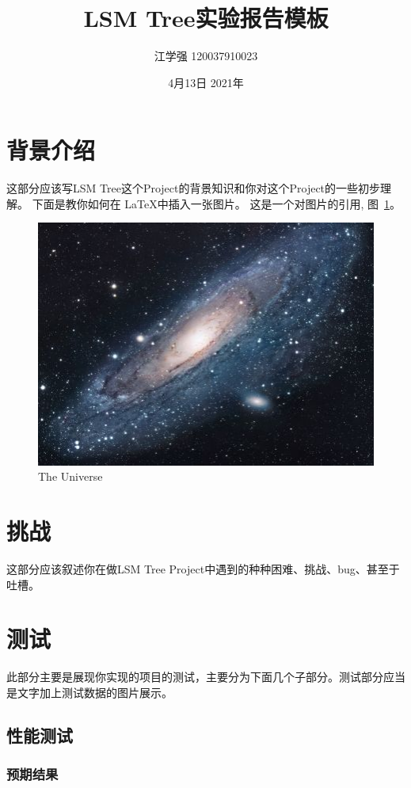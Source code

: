 \documentclass[fontset=windows]{article}
\title{LSM Tree实验报告模板}
\author{江学强 120037910023 }
\date{4月13日 2021年}
\begin{document}
\maketitle

\section{背景介绍}
这部分应该写LSM Tree这个Project的背景知识和你对这个Project的一些初步理解。 下面是教你如何在 \LaTeX 中插入一张图片。
这是一个对图片的引用, 图~\ref{fig:universe}。
\begin{figure}[h!]
\centering
\includegraphics[scale=1.7]{universe}
\caption{The Universe}
\label{fig:universe}
\end{figure}

\section{挑战}
这部分应该叙述你在做LSM Tree Project中遇到的种种困难、挑战、bug、甚至于吐槽。


\section{测试}
此部分主要是展现你实现的项目的测试，主要分为下面几个子部分。测试部分应当是文字加上测试数据的图片展示。


\subsection{性能测试}

\subsubsection{预期结果}
\end{document}
